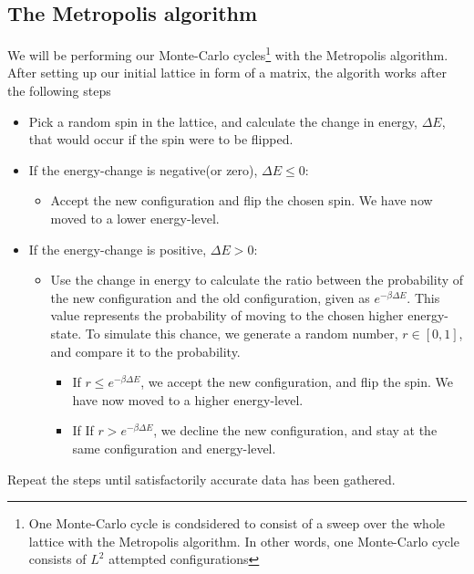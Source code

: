 \documentclass[10pt,a4paper]{article}
\begin{document}
\subsection{The Metropolis algorithm}
We will be performing our Monte-Carlo cycles\footnote{One Monte-Carlo cycle is condsidered to consist of a sweep over the whole lattice with the Metropolis algorithm. In other words, one Monte-Carlo cycle consists of $L^2$ attempted configurations} with the Metropolis algorithm. After setting up our initial lattice in form of a matrix, the algorith works after the following steps
\begin{itemize}
\item Pick a random spin in the lattice, and calculate the change in energy, $\Delta E$, that would occur if the spin were to be flipped.
\item If the energy-change is negative(or zero), $\Delta E \leq 0$:
\begin{itemize}
\item Accept the new configuration and flip the chosen spin. We have now moved to a lower energy-level.
\end{itemize}
\item If the energy-change is positive, $\Delta E > 0$:
\begin{itemize}
\item Use the change in energy to calculate the ratio between the probability of the new configuration and the old configuration, given as $e^{-\beta \Delta E}$. This value represents the probability of moving to the chosen higher energy-state. To simulate this chance, we generate a random number, $r\in [0,1]$, and compare it to the probability.
\begin{itemize}
\item If $r \leq e^{-\beta \Delta E}$, we accept the new configuration, and flip the spin. We have now moved to a higher energy-level.
\end{itemize}
\begin{itemize}
\item If If $r > e^{-\beta \Delta E}$, we decline the new configuration, and stay at the same configuration and energy-level.
\end{itemize}
\end{itemize}
\end{itemize}
Repeat the steps until satisfactorily accurate data has been gathered.
\end{document}
